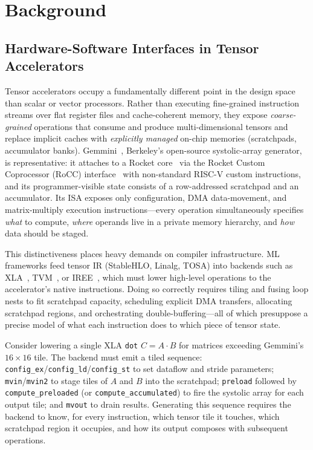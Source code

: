 \section{Background}
\label{sec:background}



\subsection{Hardware-Software Interfaces in Tensor Accelerators}
\label{subsec:hw-sw-interface}

Tensor accelerators occupy a fundamentally different point in the design space than scalar or vector processors.
Rather than executing fine-grained instruction streams over flat register files and cache-coherent memory, they expose \emph{coarse-grained} operations that consume and produce multi-dimensional tensors and replace implicit caches with \emph{explicitly managed} on-chip memories (scratchpads, accumulator banks).
Gemmini~\cite{gemmini-dac2021}, Berkeley's open-source systolic-array generator, is representative: it attaches to a Rocket core~\cite{asanovic2016rocket} via the Rocket Custom Coprocessor (RoCC) interface~\cite{chipyard} with non-standard RISC-V custom instructions, and its programmer-visible state consists of a row-addressed scratchpad and an accumulator.
Its ISA exposes only configuration, DMA data-movement, and matrix-multiply execution instructions---every operation simultaneously specifies \emph{what} to compute, \emph{where} operands live in a private memory hierarchy, and \emph{how} data should be staged.

This distinctiveness places heavy demands on compiler infrastructure.
ML frameworks feed tensor IR (StableHLO, Linalg, TOSA) into backends such as XLA~\cite{xla}, TVM~\cite{tvm}, or IREE~\cite{iree}, which must lower high-level operations to the accelerator's native instructions.
Doing so correctly requires tiling and fusing loop nests to fit scratchpad capacity, scheduling explicit DMA transfers, allocating scratchpad regions, and orchestrating double-buffering---all of which presuppose a precise model of what each instruction does to which piece of tensor state.

Consider lowering a single XLA \texttt{dot} $C{=}A{\cdot}B$ for matrices exceeding Gemmini's $16{\times}16$ tile.
The backend must emit a tiled sequence: \texttt{config\_ex}/\texttt{config\_ld}/\texttt{config\_st} to set dataflow and stride parameters; \texttt{mvin}/\texttt{mvin2} to stage tiles of $A$ and $B$ into the scratchpad; \texttt{preload} followed by \texttt{compute\_preloaded} (or \texttt{compute\_accumulated}) to fire the systolic array for each output tile; and \texttt{mvout} to drain results.
Generating this sequence requires the backend to know, for every instruction, which tensor tile it touches, which scratchpad region it occupies, and how its output composes with subsequent operations.

